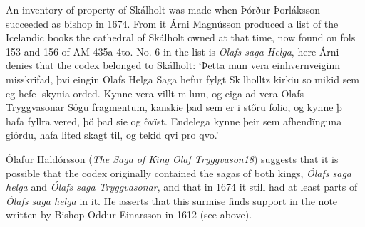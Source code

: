 \documentclass[11pt,twoside]{article}\makeatletter
\begin{document}
An inventory of property of Skálholt was made when {\name Þórður Þorláksson} succeeded as bishop in 1674. From it Árni Magnússon produced a list of the Icelandic books the cathedral of Skálholt owned at that time, now found on fols 153 and 156 of AM 435a 4to. No. 6 in the list is \textit{Olafs saga Helga}, here Árni denies that the codex belonged to Skálholt: ‘Þetta mun vera einhvernveiginn mis{\hskip1pt}\newline skrifad, þvi eingin Olafs Helga Saga {\hskip1pt}\newline  hefur fylgt Sklholltz kirkiu so mikid  sem eg hefe skynia orded. Kynne {\hskip1pt}\newline  vera villt mlum, og eiga ad vera {\hskip1pt}\newline  Olafs Tryggvasonar Sỏgu frag{\hskip1pt}\newline mentum, kanskie þad sem er i {\hskip1pt}\newline  stőru folio, og kynne þ hafa fyll{\hskip1pt}\newline ra vered, þő þad sie og ővïst. {\hskip1pt}\newline  Endelega kynne þeir sem afhend{\hskip1pt}\newline ïnguna giỏrdu, hafa lited skagt til, {\hskip1pt}\newline  og tekid qvi pro qvo.’ \par
Ólafur Haldórsson (\textit{The Saga of King Olaf Tryggvason18}) suggests that it is possible that the codex originally contained the sagas of both kings, \textit{Ólafs saga helga} and \textit{Ólafs saga Tryggvasonar}, and that in 1674 it still had at least parts of \textit{Ólafs saga helga} in it. He asserts that this surmise finds support in the note written by Bishop {\name Oddur Einarsson} in 1612 (see above).
\end{document}
